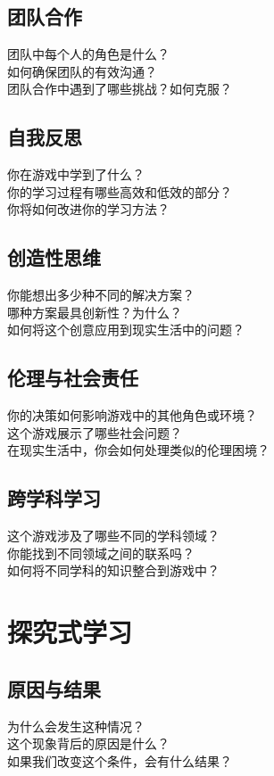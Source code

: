 \documentclass[12pt]{book}
\begin{document}
\subsection{团队合作}
团队中每个人的角色是什么？\\
如何确保团队的有效沟通？\\
团队合作中遇到了哪些挑战？如何克服？\\

\subsection{自我反思}
你在游戏中学到了什么？\\
你的学习过程有哪些高效和低效的部分？\\
你将如何改进你的学习方法？\\

\subsection{创造性思维}
你能想出多少种不同的解决方案？\\
哪种方案最具创新性？为什么？\\
如何将这个创意应用到现实生活中的问题？\\

\subsection{伦理与社会责任}
你的决策如何影响游戏中的其他角色或环境？\\
这个游戏展示了哪些社会问题？\\
在现实生活中，你会如何处理类似的伦理困境？\\

\subsection{跨学科学习}
这个游戏涉及了哪些不同的学科领域？\\
你能找到不同领域之间的联系吗？\\
如何将不同学科的知识整合到游戏中？\\


\section{探究式学习}
\subsection{原因与结果}
为什么会发生这种情况？\\
这个现象背后的原因是什么？\\
如果我们改变这个条件，会有什么结果？\\
\end{document}

